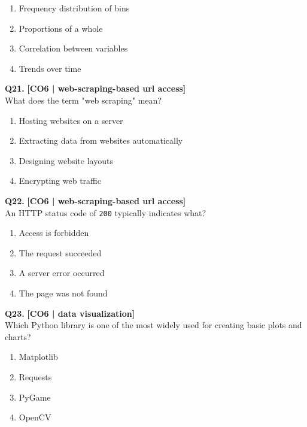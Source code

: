 \begin{enumerate}[label=(\alph*),topsep=2pt,itemsep=1pt,partopsep=0pt,parsep=0pt]
    \item \relax Frequency distribution of bins
    \item \relax Proportions of a whole
    \item \relax Correlation between variables
    \item \relax Trends over time
\end{enumerate}
\vspace{{2mm}}

\noindent\textbf{Q21.} \hfill {\small\color{LPUOrange}\textbf{[CO6 | web-scraping-based url access]}}\\[2pt]
What does the term "web scraping" mean?

\begin{enumerate}[label=(\alph*),topsep=2pt,itemsep=1pt,partopsep=0pt,parsep=0pt]
    \item \relax Hosting websites on a server
    \item \relax Extracting data from websites automatically
    \item \relax Designing website layouts
    \item \relax Encrypting web traffic
\end{enumerate}
\vspace{{2mm}}

\noindent\textbf{Q22.} \hfill {\small\color{LPUOrange}\textbf{[CO6 | web-scraping-based url access]}}\\[2pt]
An HTTP status code of \texttt{200} typically indicates what?

\begin{enumerate}[label=(\alph*),topsep=2pt,itemsep=1pt,partopsep=0pt,parsep=0pt]
    \item \relax Access is forbidden
    \item \relax The request succeeded
    \item \relax A server error occurred
    \item \relax The page was not found
\end{enumerate}
\vspace{{2mm}}

\noindent\textbf{Q23.} \hfill {\small\color{LPUOrange}\textbf{[CO6 | data visualization]}}\\[2pt]
Which Python library is one of the most widely used for creating basic plots and charts?

\begin{enumerate}[label=(\alph*),topsep=2pt,itemsep=1pt,partopsep=0pt,parsep=0pt]
    \item \relax Matplotlib
    \item \relax Requests
    \item \relax PyGame
    \item \relax OpenCV
\end{enumerate}
\vspace{{2mm}}

